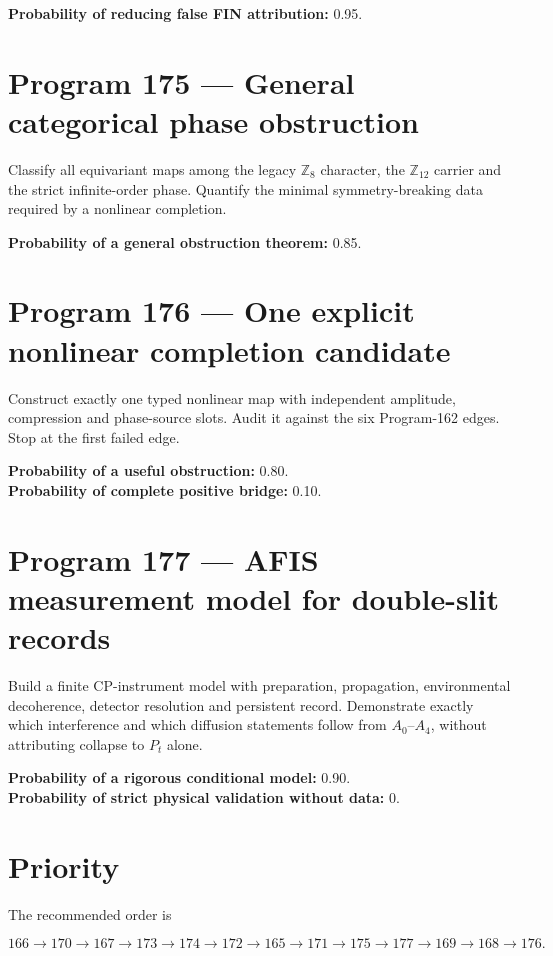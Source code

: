 \documentclass[11pt,a4paper,openany]{report}
\begin{document}
\textbf{Probability of reducing false FIN attribution:} 0.95.

\section{Program 175 --- General categorical phase obstruction}

Classify all equivariant maps among the legacy \(\mathbb Z_8\) character, the \(\mathbb Z_{12}\) carrier and the strict infinite-order phase. Quantify the minimal symmetry-breaking data required by a nonlinear completion.

\textbf{Probability of a general obstruction theorem:} 0.85.

\section{Program 176 --- One explicit nonlinear completion candidate}

Construct exactly one typed nonlinear map with independent amplitude, compression and phase-source slots. Audit it against the six Program-162 edges. Stop at the first failed edge.

\textbf{Probability of a useful obstruction:} 0.80.\\
\textbf{Probability of complete positive bridge:} 0.10.

\section{Program 177 --- AFIS measurement model for double-slit records}

Build a finite CP-instrument model with preparation, propagation, environmental decoherence, detector resolution and persistent record. Demonstrate exactly which interference and which diffusion statements follow from \(A_0\)--\(A_4\), without attributing collapse to \(P_t\) alone.

\textbf{Probability of a rigorous conditional model:} 0.90.\\
\textbf{Probability of strict physical validation without data:} 0.

\section{Priority}

The recommended order is

\[
166\to170\to167\to173\to174\to172\to165
\to171\to175\to177\to169\to168\to176.
\]
\end{document}

